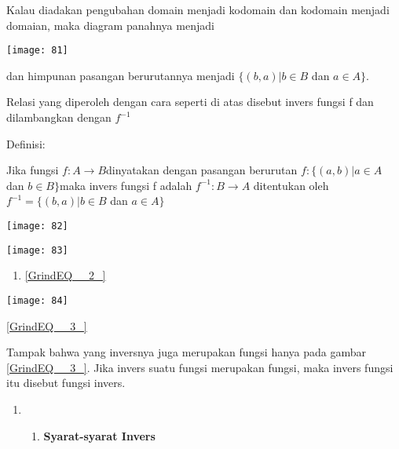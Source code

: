 \documentclass[11pt,fleqn]{book} %
\begin{document}
\noindent 

Kalau diadakan pengubahan domain menjadi kodomain dan kodomain menjadi domaian, maka diagram panahnya menjadi

\begin{center}
\noindent \texttt{[image: 81]}
\end{center}

dan himpunan pasangan berurutannya menjadi $\{ (b,a)|b\in B$ dan $a\in A\} $.

\noindent Relasi yang diperoleh dengan cara seperti di atas disebut invers fungsi f dan dilambangkan dengan $f^{-1} $

\noindent 

\noindent Definisi:

\noindent Jika fungsi $f:A\to B$dinyatakan dengan pasangan berurutan $f:\{ (a,b)|a\in A$ dan $b\in B\} $maka invers fungsi f adalah $f^{-1} :B\to A$ ditentukan oleh $f^{-1} =\{ (b,a)|b\in B$ dan $a\in A\} $

\noindent 

\begin{center}
\noindent \texttt{[image: 82]}
\end{center}

\begin{center}
\texttt{[image: 83]}
\end{center}

\begin{enumerate}
\item  \eqref{GrindEQ__2_}
\end{enumerate}

\noindent 

\noindent 

\begin{center}
\noindent \texttt{[image: 84]}
\end{center}

\noindent \eqref{GrindEQ__3_}

\noindent 

Tampak bahwa yang inversnya juga merupakan fungsi hanya pada gambar \eqref{GrindEQ__3_}. Jika invers suatu fungsi merupakan fungsi, maka invers fungsi itu disebut fungsi invers.

\noindent \textbf{}

\begin{enumerate}
\item \begin{enumerate}
\item \textbf{ Syarat-syarat Invers }
\end{enumerate}
\end{enumerate}
\end{document}
